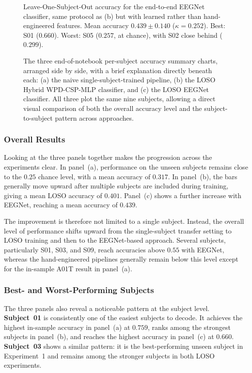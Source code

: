 \documentclass[11pt,a4paper]{article}
\begin{document}
\begin{figure}[H]
\begin{minipage}[t]{0.32\linewidth}
{			Leave-One-Subject-Out accuracy for the end-to-end EEGNet classifier, same protocol as (b) but with
			learned rather than hand-engineered features. Mean accuracy $0.439 \pm 0.140$ ($\kappa = 0.252$).
			Best: S01 ($0.660$). Worst: S05 ($0.257$, at chance), with S02 close behind ($0.299$).
		}
	\end{minipage}
	\caption{The three end-of-notebook per-subject accuracy summary charts, arranged side by side, with
		a brief explanation directly beneath each: (a) the naive single-subject-trained pipeline, (b) the
		LOSO Hybrid WPD-CSP-MLP classifier, and (c) the LOSO EEGNet classifier. All three plot the same nine
		subjects, allowing a direct visual comparison of both the overall accuracy level and the
		subject-to-subject pattern across approaches.}
	\label{fig:three-final-charts}
\end{figure}

\subsubsection{Overall Results}

Looking at the three panels together makes the progression across the experiments clear. In
panel~(a), performance on the unseen subjects remains close to the $0.25$ chance level, with a
mean accuracy of $0.317$. In panel~(b), the bars generally move upward after multiple subjects
are included during training, giving a mean LOSO accuracy of $0.401$. Panel~(c) shows a further
increase with EEGNet, reaching a mean accuracy of $0.439$.

The improvement is therefore not limited to a single subject. Instead, the overall level of
performance shifts upward from the single-subject transfer setting to LOSO training and then to
the EEGNet-based approach. Several subjects, particularly S01, S03, and S09, reach accuracies
above $0.55$ with EEGNet, whereas the hand-engineered pipelines generally remain below this level
except for the in-sample A01T result in panel~(a).

\subsubsection{Best- and Worst-Performing Subjects}

The three panels also reveal a noticeable pattern at the subject level. \textbf{Subject~01}
is consistently one of the easiest subjects to decode. It achieves the highest in-sample
accuracy in panel~(a) at $0.759$, ranks among the strongest subjects in panel~(b), and reaches
the highest accuracy in panel~(c) at $0.660$. \textbf{Subject~03} shows a similar pattern:
it is the best-performing unseen subject in Experiment~1 and remains among the stronger subjects
in both LOSO experiments.
\end{document}
